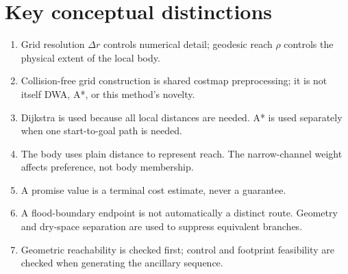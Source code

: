 \documentclass[11pt,a4paper]{article}
\begin{document}
\section{Key conceptual distinctions}

\begin{enumerate}[leftmargin=*]
  \item Grid resolution $\Delta r$ controls numerical detail; geodesic reach
  $\rho$ controls the physical extent of the local body.
  \item Collision-free grid construction is shared costmap preprocessing; it
  is not itself DWA, A*, or this method's novelty.
  \item Dijkstra is used because all local distances are needed. A* is used
  separately when one start-to-goal path is needed.
  \item The body uses plain distance to represent reach. The narrow-channel
  weight affects preference, not body membership.
  \item A promise value is a terminal cost estimate, never a guarantee.
  \item A flood-boundary endpoint is not automatically a distinct route.
  Geometry and dry-space separation are used to suppress equivalent branches.
  \item Geometric reachability is checked first; control and footprint
  feasibility are checked when generating the ancillary sequence.
\end{enumerate}
\end{document}
